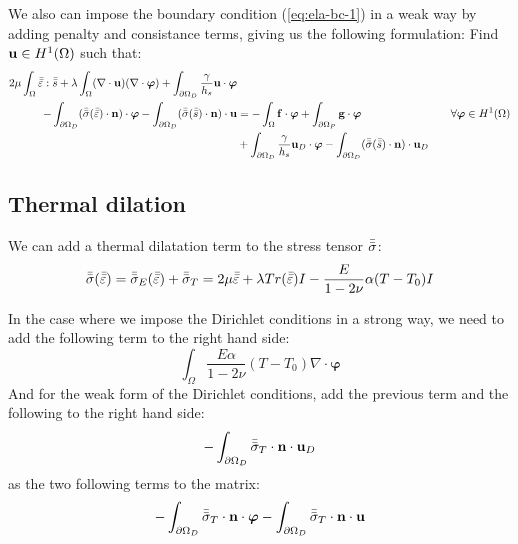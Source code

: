 We also can impose the boundary condition (\ref{eq:ela-bc-1}) in a weak way by
adding penalty and consistance terms, giving us the following formulation:
Find $\mathbf{u}\in H^1(\Omega)$ such that:
\begin{alignat}{2}
  2\mu \int_\Omega \bar{\bar{\varepsilon}}:\bar{\bar{s}}
  + \lambda \int_\Omega (\nabla\cdot\mathbf{u})(\nabla\cdot\bm{\varphi})
  + \int_{\partial \Omega_D} \frac{\gamma}{h_s} \mathbf{u} \cdot \bm{\varphi}
  &&& \nonumber \\
  - \int_{\partial \Omega_D}
  (\bar{\bar{\sigma}}(\bar{\bar{\varepsilon}}) \cdot \mathbf{n}) \cdot \bm{\varphi}
  - \int_{\partial \Omega_D} (\bar{\bar{\sigma}}(\bar{\bar{s}}) \cdot \mathbf{n}) \cdot \mathbf{u}
  &= - \int_\Omega \mathbf{f}\cdot\bm{\varphi}
  + \int_{\partial\Omega_P} \mathbf{g}\cdot\bm{\varphi}
  && \quad \forall \bm{\varphi}\in H^1(\Omega) \label{eq:ela-vf-weak} \\
  & + \int_{\partial \Omega_D} \frac{\gamma}{h_s} \mathbf{u}_D \cdot \bm{\varphi}
  - \int_{\partial \Omega_D} (\bar{\bar{\sigma}}(\bar{\bar{s}}) \cdot \mathbf{n}) \cdot \mathbf{u}_D
  \nonumber
\end{alignat}

\subsection{Thermal dilation}
We can add a thermal dilatation term to the stress tensor $\bar{\bar{\sigma}}$:
\begin{equation}
  \bar{\bar{\sigma}}(\bar{\bar{\varepsilon}})
  = \bar{\bar{\sigma}}_E(\bar{\bar{\varepsilon}}) + \bar{\bar{\sigma}}_T
  = 2\mu\bar{\bar{\varepsilon}} + \lambda Tr(\bar{\bar{\varepsilon}})I
  - \frac{E}{1-2\nu}\alpha(T-T_0)I
\end{equation}

In the case where we impose the Dirichlet conditions in a strong way, we need to
add the following term to the right hand side:
\begin{equation}
  \int_\Omega \frac{E\alpha}{1-2\nu}(T-T_0)\nabla\cdot\bm{\varphi}
\end{equation}
And for the weak form of the Dirichlet conditions, add the previous term and the
following to the right hand side:
\begin{equation}
  -\int_{\partial\Omega_D} \bar{\bar{\sigma}}_T\cdot\mathbf{n}\cdot\mathbf{u}_D
\end{equation}
as the two following terms to the matrix:
\begin{equation}
  -\int_{\partial\Omega_D} \bar{\bar{\sigma}}_T\cdot\mathbf{n}\cdot\bm{\varphi}
  -\int_{\partial\Omega_D} \bar{\bar{\sigma}}_T\cdot\mathbf{n}\cdot\mathbf{u}
\end{equation}
